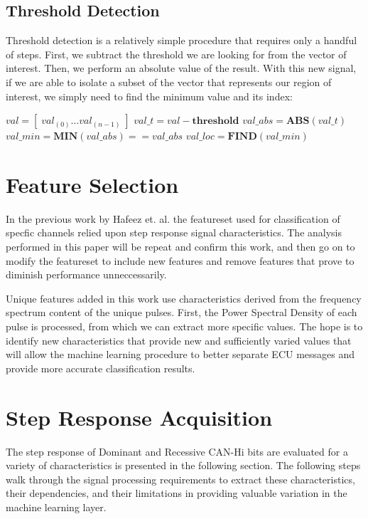 \documentclass[conference]{IEEEtran}
\begin{document}
\subsection{Threshold Detection} \label{sec:Threshold}
Threshold detection is a relatively simple procedure that requires only a handful of steps. First, we subtract the threshold we are looking for from the vector of interest. Then, we perform an absolute value of the result. With this new signal, if we are able to isolate a subset of the vector that represents our region of  interest, we simply need to find the minimum value and its index:
\medbreak
\begin{algorithmic}
\STATE $val = [\;val_{(0)} ... val_{(n-1)}\;]$
\STATE $val\_t = val - \textbf{threshold}$
\STATE $val\_abs = \textbf{ABS}(val\_t)$
\STATE $val\_min = \textbf{MIN}(val\_abs) == val\_abs$
\STATE $val\_loc = \textbf{FIND}( val\_min ) $
\end{algorithmic}

\section{Feature Selection}

In the previous work by Hafeez et. al. \cite{hafeez2019} the featureset used for classification of specfic channels relied upon step response signal characteristics. The analysis performed in this paper will be repeat and confirm this work, and then go on to modify the featureset to include new features and remove features that prove to diminish performance unneccessarily.

Unique features added in this work use characteristics derived from the frequency spectrum content of the unique pulses. First, the Power Spectral Density of each pulse is processed, from which we can extract more specific values. The hope is to identify new characteristics that provide new and sufficiently varied values that will allow the machine learning procedure to better separate ECU messages and provide more accurate classification results.

\section{Step Response Acquisition}

The step response of Dominant and Recessive CAN-Hi bits are evaluated for a variety of characteristics is presented in the following section. The following steps walk through the signal processing requirements to extract these characteristics, their dependencies, and their limitations in providing valuable variation in the machine learning layer.
\end{document}
